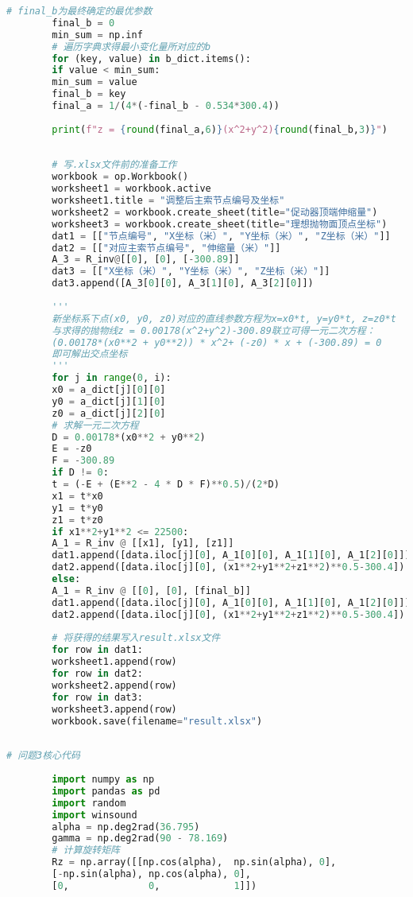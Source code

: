 \documentclass{cumcmthesis}
\begin{document}
\begin{appendices}
\begin{lstlisting}[language={python}]
		# final_b为最终确定的最优参数
		final_b = 0
		min_sum = np.inf
		# 遍历字典求得最小变化量所对应的b
		for (key, value) in b_dict.items():
		if value < min_sum:
		min_sum = value
		final_b = key
		final_a = 1/(4*(-final_b - 0.534*300.4))
		
		print(f"z = {round(final_a,6)}(x^2+y^2){round(final_b,3)}")
		
		
		# 写.xlsx文件前的准备工作
		workbook = op.Workbook()
		worksheet1 = workbook.active
		worksheet1.title = "调整后主索节点编号及坐标"
		worksheet2 = workbook.create_sheet(title="促动器顶端伸缩量")
		worksheet3 = workbook.create_sheet(title="理想抛物面顶点坐标")
		dat1 = [["节点编号", "X坐标（米）", "Y坐标（米）", "Z坐标（米）"]]
		dat2 = [["对应主索节点编号", "伸缩量（米）"]]
		A_3 = R_inv@[[0], [0], [-300.89]]
		dat3 = [["X坐标（米）", "Y坐标（米）", "Z坐标（米）"]]
		dat3.append([A_3[0][0], A_3[1][0], A_3[2][0]])
		
		'''
		新坐标系下点(x0, y0, z0)对应的直线参数方程为x=x0*t, y=y0*t, z=z0*t
		与求得的抛物线z = 0.00178(x^2+y^2)-300.89联立可得一元二次方程：
		(0.00178*(x0**2 + y0**2)) * x^2+ (-z0) * x + (-300.89) = 0
		即可解出交点坐标
		'''
		for j in range(0, i):
		x0 = a_dict[j][0][0]
		y0 = a_dict[j][1][0]
		z0 = a_dict[j][2][0]
		# 求解一元二次方程
		D = 0.00178*(x0**2 + y0**2)
		E = -z0
		F = -300.89
		if D != 0:
		t = (-E + (E**2 - 4 * D * F)**0.5)/(2*D)
		x1 = t*x0
		y1 = t*y0
		z1 = t*z0
		if x1**2+y1**2 <= 22500:
		A_1 = R_inv @ [[x1], [y1], [z1]]
		dat1.append([data.iloc[j][0], A_1[0][0], A_1[1][0], A_1[2][0]])
		dat2.append([data.iloc[j][0], (x1**2+y1**2+z1**2)**0.5-300.4])
		else:
		A_1 = R_inv @ [[0], [0], [final_b]]
		dat1.append([data.iloc[j][0], A_1[0][0], A_1[1][0], A_1[2][0]])
		dat2.append([data.iloc[j][0], (x1**2+y1**2+z1**2)**0.5-300.4])
		
		# 将获得的结果写入result.xlsx文件
		for row in dat1:
		worksheet1.append(row)
		for row in dat2:
		worksheet2.append(row)
		for row in dat3:
		worksheet3.append(row)
		workbook.save(filename="result.xlsx")
		
	\end{lstlisting}  %
	\begin{lstlisting}[language={python}]  
		# 问题3核心代码
		
		import numpy as np
		import pandas as pd
		import random
		import winsound
		alpha = np.deg2rad(36.795)
		gamma = np.deg2rad(90 - 78.169)
		# 计算旋转矩阵
		Rz = np.array([[np.cos(alpha),  np.sin(alpha), 0],
		[-np.sin(alpha), np.cos(alpha), 0],
		[0,              0,             1]])
		

\end{lstlisting}
\end{appendices}
\end{document}
